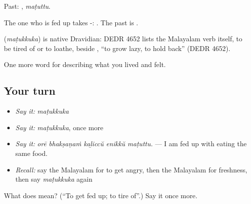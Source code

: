 Past: , \emph{maṭuttu}.

The one who is fed up takes -:  . The past is .

\begin{cousinweb}
\textbf{} (\emph{maṭukkuka}) is native Dravidian: DEDR 4652 lists the Malayalam verb itself, to be tired of or to loathe, beside , \textquotedblleft{}to grow lazy, to hold back\textquotedblright{} (DEDR 4652).
\end{cousinweb}

\begin{grammarlens}[title={What you've built}]
One more word for describing what you lived and felt.
\end{grammarlens}

\subsection*{Your turn}
\begin{itemize}
\raggedright
  \item \emph{Say it:} \emph{maṭukkuka}
  \item \emph{Say it:} \emph{maṭukkuka}, once more
  \item \emph{Say it:} \emph{orē bhakṣaṇaṁ kaḻiccŭ enikkŭ maṭuttu.} — I am fed up with eating the same food.
  \item \emph{Recall:} say the Malayalam for to get angry, then the Malayalam for freshness, then say \emph{maṭukkuka} again
\end{itemize}

\begin{tcolorbox}[breakable,colback=teal!4,colframe=teal!35!black,title={Before you move on}]
What does  mean? (\textquotedblleft{}To get fed up; to tire of\textquotedblright{}.) Say it once more.
\end{tcolorbox}

